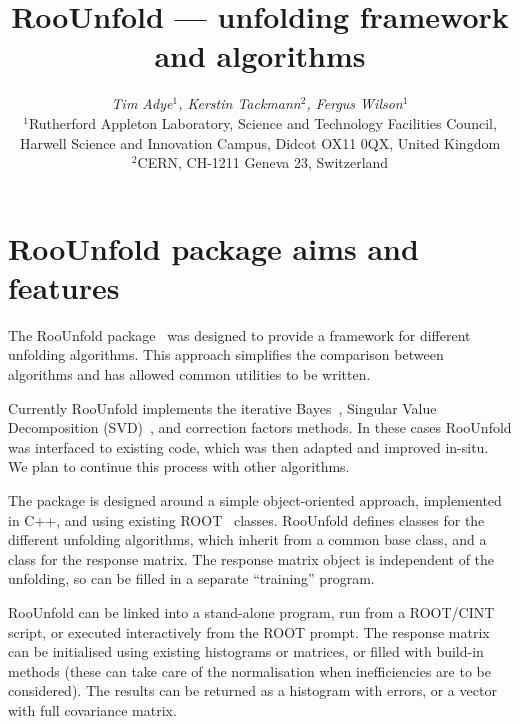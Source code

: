 \documentclass{desyproc}
\begin{document}
\title{RooUnfold --- unfolding framework and algorithms}

\author{{\slshape Tim Adye$^1$, Kerstin Tackmann$^2$, Fergus Wilson$^1$}\\[1ex]
$^1$Rutherford Appleton Laboratory, Science and Technology Facilities Council, Harwell Science and Innovation Campus, Didcot OX11 0QX, United Kingdom\\
$^2$CERN, CH-1211 Geneva 23, Switzerland}

\doi            %

\maketitle

\begin{abstract}
\end{abstract}

\section{RooUnfold package aims and features}

The RooUnfold package~\cite{RooUnfold-web} was designed to provide a framework for different unfolding algorithms.
This approach simplifies the comparison between algorithms and has allowed
common utilities to be written.

Currently RooUnfold implements the iterative Bayes~\cite{D'Agostini:1994zf},
Singular Value Decomposition (SVD)~\cite{Hocker:1995kb}, and correction factors methods.
In these cases RooUnfold was interfaced to existing code, which
was then adapted and improved in-situ. We plan to continue this process with
other algorithms.

The package is designed around a simple object-oriented approach, implemented in
C++, and using existing ROOT~\cite{Brun:1997pa} classes. RooUnfold defines classes for the different
unfolding algorithms, which inherit from a common base class, and a class for
the response matrix. The response matrix object is independent of the unfolding,
so can be filled in a separate ``training'' program.

RooUnfold can be linked into a stand-alone program, run from a ROOT/CINT script, or
executed interactively from the ROOT prompt.
The response matrix can be initialised using existing histograms or matrices, or
filled with build-in methods (these can take care of the normalisation when inefficiencies are to be considered).
The results can be returned as a histogram with errors, or a vector with full covariance matrix.
\end{document}
